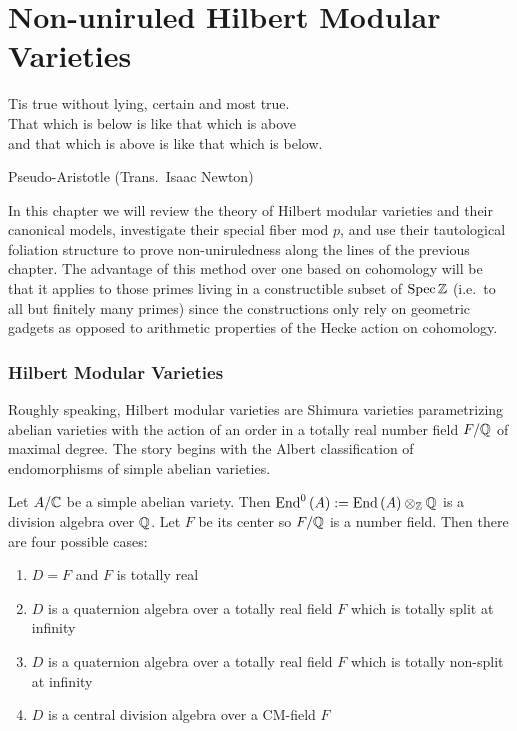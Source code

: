 \documentclass[main.tex]{subfiles}
\begin{document}
\chapter{Non-uniruled Hilbert Modular Varieties} \label{chapter:hilbert}

\epigraph{%
\raggedright
Tis true without lying, certain and most true. \\
That which is below is like that which is above \\
and that which is above is like that which is below.}{Pseudo-Aristotle (Trans.\ Isaac Newton)}

In this chapter we will review the theory of Hilbert modular varieties and their canonical models, investigate their special fiber mod $p$, and use their tautological foliation structure to prove non-uniruledness along the lines of the previous chapter. The advantage of this method over one based on \etale cohomology will be that it applies to those primes living in a constructible subset of $\operatorname{\mathrm{Spec}}{\mathbb{Z}}$ (i.e.\ to all but finitely many primes) since the constructions only rely on geometric gadgets as opposed to arithmetic properties of the Hecke action on cohomology. 

\subsection{Hilbert Modular Varieties}

Roughly speaking, Hilbert modular varieties are Shimura varieties parametrizing abelian varieties with the action of an order in a totally real number field $F / \mathbb{Q}$ of maximal degree. The story begins with the Albert classification of endomorphisms of simple abelian varieties.

\begin{theorem}
Let $A/\mathbb{C}$ be a simple abelian variety. Then $\operatorname{\mathrm{End}}^0{(A)} := \operatorname{\mathrm{End}}{(A)} \otimes_{\mathbb{Z}} \mathbb{Q}$ is a division algebra over $\mathbb{Q}$. Let $F$ be its center so $F / \mathbb{Q}$ is a number field. Then there are four possible cases:
\begin{enumerate}
    \item $D = F$ and $F$ is totally real
    \item $D$ is a quaternion algebra over a totally real field $F$ which is totally split at infinity
    \item $D$ is a quaternion algebra over a totally real field $F$ which is totally non-split at infinity
    \item $D$ is a central division algebra over a CM-field $F$
\end{enumerate}
\end{theorem}
\end{document}
